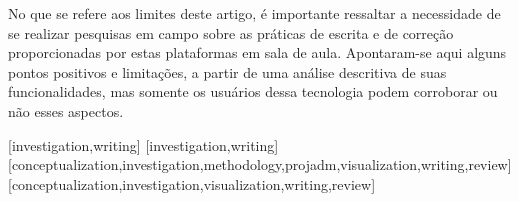 \documentclass[portuguese]{textolivre}
\begin{document}
No que se refere aos limites deste artigo, é importante ressaltar a necessidade de se realizar pesquisas em campo sobre as práticas de escrita e de correção proporcionadas por estas plataformas em sala de aula. Apontaram-se aqui alguns pontos positivos e limitações, a partir de uma análise descritiva de suas funcionalidades, mas somente os usuários dessa tecnologia podem corroborar ou não esses aspectos.



\printbibliography\label{sec-bib}


\begin{contributors}
[investigation,writing]
[investigation,writing]
[conceptualization,investigation,methodology,projadm,visualization,writing,review]
[conceptualization,investigation,visualization,writing,review]
\end{contributors}

\begin{dataavailability}
\end{dataavailability}
\end{document}
